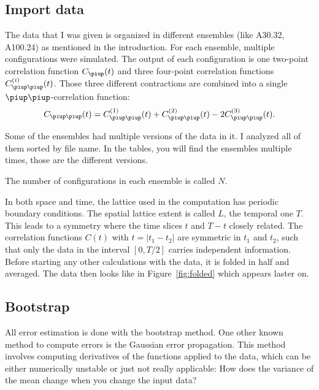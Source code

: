 \documentclass[11pt, english, fleqn, DIV=10, headinclude]{scrartcl}
\begin{document}
\subsection{Import data}
\label{sec:import}

The data that I was given is organized in different ensembles (like A30.32,
A100.24) as mentioned in the introduction. For each ensemble, multiple
configurations were simulated. The output of each configuration is one
two-point correlation function $C_\piup(t)$ and three four-point correlation
functions $C_{\piup\piup}^{(i)}(t)$. Those three different contractions are
combined into a single $\piup\piup$-correlation function:
\begin{equation}
    C_{\piup\piup}(t) = C_{\piup\piup}^{(1)}(t) + C_{\piup\piup}^{(2)}(t)
    - 2 C_{\piup\piup}^{(3)}(t).
\end{equation}

Some of the ensembles had multiple versions of the data in it. I analyzed all
of them sorted by file name. In the tables, you will find the ensembles
multiple times, those are the different versions.

The number of configurations in each ensemble is called $N$.

In both space and time, the lattice used in the computation has periodic
boundary conditions. The spatial lattice extent is called $L$, the temporal one
$T$. This leads to a symmetry where the time slices $t$ and $T-t$ closely
related. The correlation functions $C(t)$ with $t = |t_1 - t_2|$ are symmetric
in $t_1$ and $t_2$, such that only the data in the interval $[0, T/2]$ carries
independent information. Before starting any other calculations with the data,
it is folded in half and averaged. The data then looks like in
Figure~\ref{fig:folded} which appears laster on.

\subsection{Bootstrap}
\label{sec:bootstrap}

All error estimation is done with the bootstrap method. One other known method
to compute errors is the Gaussian error propagation. This method involves
computing derivatives of the functions applied to the data, which can be either
numerically unstable or just not really applicable: How does the variance of
the mean change when you change the input data?
\end{document}
